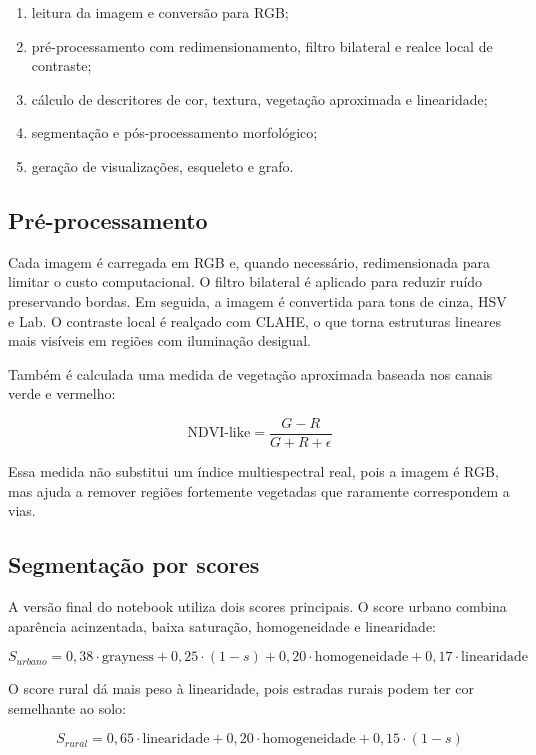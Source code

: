 \documentclass[12pt,a4paper]{article}
\begin{document}
\begin{enumerate}[label=\textbf{Etapa \arabic*:}, leftmargin=*]
    \item leitura da imagem e conversão para RGB;
    \item pré-processamento com redimensionamento, filtro bilateral e realce local de contraste;
    \item cálculo de descritores de cor, textura, vegetação aproximada e linearidade;
    \item segmentação e pós-processamento morfológico;
    \item geração de visualizações, esqueleto e grafo.
\end{enumerate}

\subsection{Pré-processamento}

Cada imagem é carregada em RGB e, quando necessário, redimensionada para limitar o custo computacional. O filtro bilateral é aplicado para reduzir ruído preservando bordas. Em seguida, a imagem é convertida para tons de cinza, HSV e Lab. O contraste local é realçado com CLAHE, o que torna estruturas lineares mais visíveis em regiões com iluminação desigual.

Também é calculada uma medida de vegetação aproximada baseada nos canais verde e vermelho:

\[
    \text{NDVI-like} = \frac{G - R}{G + R + \epsilon}
\]

Essa medida não substitui um índice multiespectral real, pois a imagem é RGB, mas ajuda a remover regiões fortemente vegetadas que raramente correspondem a vias.

\subsection{Segmentação por scores}

A versão final do notebook utiliza dois scores principais. O score urbano combina aparência acinzentada, baixa saturação, homogeneidade e linearidade:

\[
    S_{urbano} =
    0{,}38 \cdot \text{grayness} +
    0{,}25 \cdot (1 - s) +
    0{,}20 \cdot \text{homogeneidade} +
    0{,}17 \cdot \text{linearidade}
\]

O score rural dá mais peso à linearidade, pois estradas rurais podem ter cor semelhante ao solo:

\[
    S_{rural} =
    0{,}65 \cdot \text{linearidade} +
    0{,}20 \cdot \text{homogeneidade} +
    0{,}15 \cdot (1 - s)
\]
\end{document}
